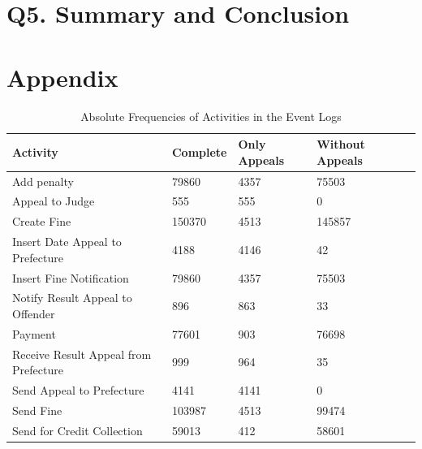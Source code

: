 \documentclass[12pt]{report}
\begin{document}
\section{Q5. Summary and Conclusion}

\section*{Appendix}

\begin{table}[H]
\centering
\begin{tabular}{|l|l|l|l|l|}
\hline \textbf{Activity} & \textbf{Complete} & \textbf{Only Appeals} & \textbf{Without Appeals} \\
\hline Add penalty & 79860 & 4357 & 75503\\
\hline Appeal to Judge & 555 & 555 &0\\
\hline Create Fine & 150370 & 4513 & 145857\\
\hline Insert Date Appeal to Prefecture & 4188 & 4146 & 42\\
\hline Insert Fine Notification & 79860 & 4357 & 75503\\
\hline Notify Result Appeal to Offender & 896 & 863 & 33\\
\hline Payment  & 77601 & 903 & 76698\\
\hline Receive Result Appeal from Prefecture & 999 & 964 & 35\\
\hline Send Appeal to Prefecture  & 4141 & 4141 & 0\\
\hline Send Fine  & 103987 & 4513 & 99474\\
\hline Send for Credit Collection & 59013 & 412 & 58601\\
\hline
\end{tabular}
\caption{Absolute Frequencies of Activities in the Event Logs}
\label{tab:1c_absolut}
\end{table}
\end{document}
